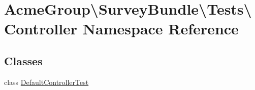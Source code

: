 \hypertarget{namespace_acme_group_1_1_survey_bundle_1_1_tests_1_1_controller}{\section{Acme\+Group\textbackslash{}Survey\+Bundle\textbackslash{}Tests\textbackslash{}Controller Namespace Reference}
\label{namespace_acme_group_1_1_survey_bundle_1_1_tests_1_1_controller}
}
\subsection*{Classes}
\begin{DoxyCompactItemize}
\item 
class \hyperlink{class_acme_group_1_1_survey_bundle_1_1_tests_1_1_controller_1_1_default_controller_test}{Default\+Controller\+Test}
\end{DoxyCompactItemize}
